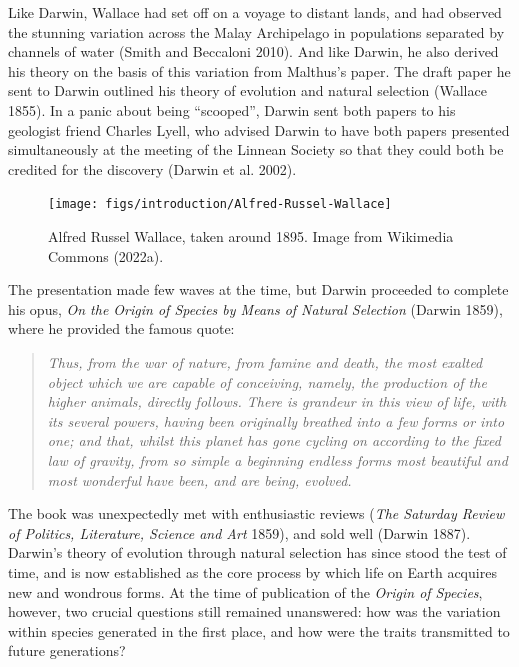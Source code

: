 \documentclass[
]{book}
\begin{document}
Like Darwin, Wallace had set off on a voyage to distant lands, and had observed the stunning variation across the Malay Archipelago in populations separated by channels of water (Smith and Beccaloni 2010). And like Darwin, he also derived his theory on the basis of this variation from Malthus's paper. The draft paper he sent to Darwin outlined his theory of evolution and natural selection (Wallace 1855). In a panic about being ``scooped'', Darwin sent both papers to his geologist friend Charles Lyell, who advised Darwin to have both papers presented simultaneously at the meeting of the Linnean Society so that they could both be credited for the discovery (Darwin et al. 2002).



\begin{figure}

{\centering \texttt{[image: figs/introduction/Alfred-Russel-Wallace]} 

}

\caption{Alfred Russel Wallace, taken around 1895. Image from Wikimedia Commons (2022a).}\label{fig:alfred-wallace}
\end{figure}

The presentation made few waves at the time, but Darwin proceeded to complete his opus, \emph{On the Origin of Species by Means of Natural Selection} (Darwin 1859), where he provided the famous quote:

\begin{quote}
\emph{Thus, from the war of nature, from famine and death, the most exalted object which we are capable of conceiving, namely, the production of the higher animals, directly follows. There is grandeur in this view of life, with its several powers, having been originally breathed into a few forms or into one; and that, whilst this planet has gone cycling on according to the fixed law of gravity, from so simple a beginning endless forms most beautiful and most wonderful have been, and are being, evolved.}
\end{quote}

The book was unexpectedly met with enthusiastic reviews (\emph{The {Saturday Review} of {Politics}, {Literature}, {Science} and {Art}} 1859), and sold well (Darwin 1887). Darwin's theory of evolution through natural selection has since stood the test of time, and is now established as the core process by which life on Earth acquires new and wondrous forms. At the time of publication of the \emph{Origin of Species}, however, two crucial questions still remained unanswered: how was the variation within species generated in the first place, and how were the traits transmitted to future generations?
\end{document}
